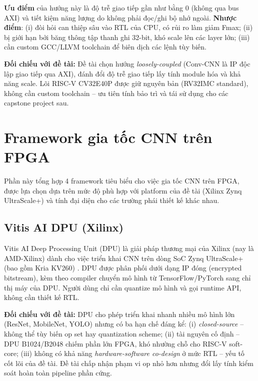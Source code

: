 \textbf{Ưu điểm} của hướng này là độ trễ giao tiếp gần như bằng 0 (không qua bus AXI) và tiết kiệm năng lượng do không phải đọc/ghi bộ nhớ ngoài. \textbf{Nhược điểm}: (i) đòi hỏi can thiệp sâu vào RTL của CPU, có rủi ro làm giảm Fmax; (ii) bị giới hạn bởi băng thông tập thanh ghi 32-bit, khó scale lên các layer lớn; (iii) cần custom GCC/LLVM toolchain để biên dịch các lệnh tùy biến.

\textbf{Đối chiếu với đề tài:} Đề tài chọn hướng \textit{loosely-coupled} (Conv-CNN là IP độc lập giao tiếp qua AXI), đánh đổi độ trễ giao tiếp lấy tính module hóa và khả năng scale. Lõi RISC-V CV32E40P được giữ nguyên bản (RV32IMC standard), không cần custom toolchain -- ưu tiên tính bảo trì và tái sử dụng cho các capstone project sau.

\newpage
\section{Framework gia tốc CNN trên FPGA}
\label{sec:fpga_frameworks}

Phần này tổng hợp 4 framework tiêu biểu cho việc gia tốc CNN trên FPGA, được lựa chọn dựa trên mức độ phù hợp với platform của đề tài (Xilinx Zynq UltraScale+) và tính đại diện cho các trường phái thiết kế khác nhau.

\subsection{Vitis AI DPU (Xilinx)}
Vitis AI Deep Processing Unit (DPU) là giải pháp thương mại của Xilinx (nay là AMD-Xilinx) dành cho việc triển khai CNN trên dòng SoC Zynq UltraScale+ (bao gồm Kria KV260) \cite{vitis_ai}. DPU được phân phối dưới dạng IP đóng (encrypted bitstream), kèm theo compiler chuyển mô hình từ TensorFlow/PyTorch sang chỉ thị máy của DPU. Người dùng chỉ cần quantize mô hình và gọi runtime API, không cần thiết kế RTL.

\textbf{Đối chiếu với đề tài:} DPU cho phép triển khai nhanh nhiều mô hình lớn (ResNet, MobileNet, YOLO) nhưng có ba hạn chế đáng kể: (i) \textit{closed-source} -- không thể tùy biến op set hay quantization scheme; (ii) tài nguyên cố định -- DPU B1024/B2048 chiếm phần lớn FPGA, khó nhường chỗ cho RISC-V soft-core; (iii) không có khả năng \textit{hardware-software co-design} ở mức RTL -- yếu tố cốt lõi của đề tài. Đề tài chấp nhận phạm vi op nhỏ hơn nhưng đổi lấy tính kiểm soát hoàn toàn pipeline phần cứng.


